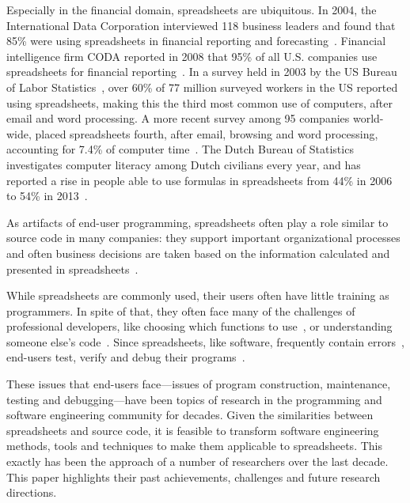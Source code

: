 \documentclass[conference]{IEEEtran}
\begin{document}
Especially in the financial domain, spreadsheets are ubiquitous. In 2004, the International Data Corporation interviewed 118 business leaders and found that 85\% were using spreadsheets in financial reporting and forecasting~\cite{Panko2008}.  Financial intelligence firm CODA reported in 2008 that 95\% of all U.S. companies use spreadsheets for financial reporting~\cite{Panko2008}. In a survey held in 2003 by the US Bureau of Labor Statistics~\cite{BLS2003}, over 60\% of 77 million surveyed workers in the US reported using spreadsheets, making this the third most common use of computers, after email and word processing. A more recent survey among 95 companies world-wide, placed spreadsheets fourth, after email, browsing and word processing, accounting for 7.4\% of computer time~\cite{Wellnomics2007}. The Dutch Bureau of Statistics investigates computer literacy among Dutch civilians every year, and has reported a rise in people able to use formulas in spreadsheets from 44\% in 2006 to 54\% in 2013~\cite{CBS2013}.

As artifacts of end-user programming, spreadsheets often play a role similar to source code in many companies: they support important organizational processes and often business decisions are taken based on the information calculated and presented in spreadsheets~\cite{hermans_supporting_2011}.

While spreadsheets are commonly used, their users often have little training as programmers. In spite of that, they often face many of the challenges of professional developers, like choosing which functions to use~\cite{Ko2004}, or understanding someone else's code~\cite{Ko2011}. Since spreadsheets, like software, frequently contain errors~\cite{Panko1998}, end-users test, verify and debug their programs~\cite{Hermans2013-Cascon,Ko2004-Why}.

These issues that end-users face---issues of program construction, maintenance, testing and debugging---have been topics of research in the programming and software engineering community for decades. Given the similarities between spreadsheets and source code, it is feasible to transform software engineering methods, tools and techniques to make them applicable to spreadsheets. This exactly has been the approach of a number of researchers over the last decade. This paper highlights their past achievements, challenges and future research directions. 
\end{document}
